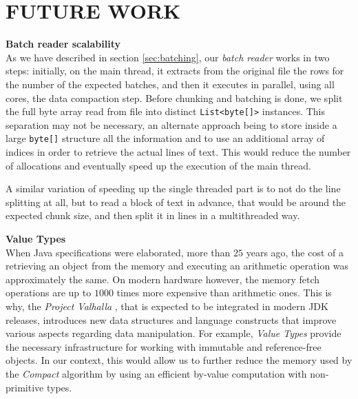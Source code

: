 \documentclass[a4paper,twoside]{article}
\begin{document}
\section{\uppercase{Future work}}
\textbf{Batch reader scalability} \\
As we have described in section \ref{sec:batching}, our {\it batch reader} works in two steps: initially, on the main thread, it extracts from the original file the rows for the number of the expected batches, and then it executes in parallel, using all cores, the data compaction step.
Before chunking and batching is done, we split the full byte array read from file into distinct  \texttt{List<byte[]>} instances. This separation may not be necessary, an alternate approach being to store inside a large \texttt{byte[]} structure all the information and to use an additional array of indices in order to retrieve the actual lines of text. This would reduce the number of allocations and eventually speed up the execution of the main thread.

A similar variation of speeding up the single threaded part is to not do the line splitting at all, but to read a block of text in advance, that would be around the expected chunk size,
and then split it in lines in a multithreaded way.

\textbf{Value Types} \\
When Java specifications were elaborated, more than $25$ years ago, the cost of a retrieving an object from the memory and executing an arithmetic operation was approximately the same. On modern hardware however, the memory fetch operations are up to $1000$ times more expensive than arithmetic ones.
This is why, the {\it Project Valhalla} \cite{jdk:valhalla}, that is expected to be integrated in modern JDK releases, introduces new data structures and language constructs that improve various aspects regarding data manipulation. For example, {\it Value Types} provide the necessary infrastructure for working with immutable and reference-free objects. In our context, this would allow us to further reduce the memory used by the {\it Compact} algorithm by using an efficient by-value computation with non-primitive types. 
\end{document}
